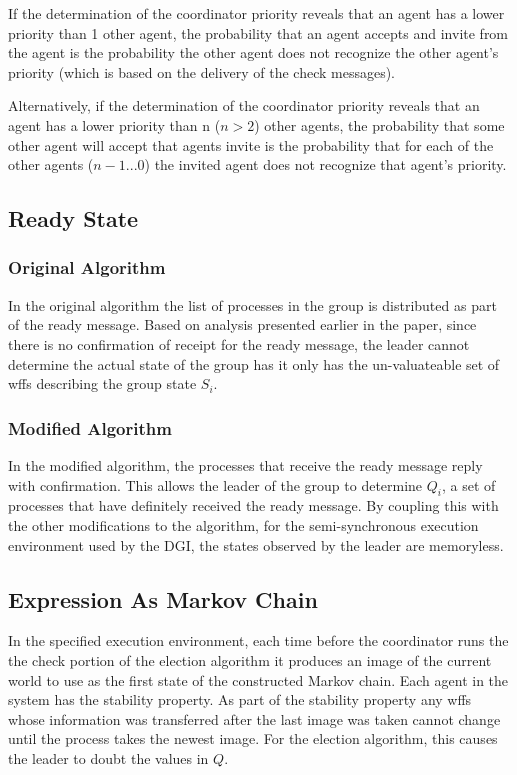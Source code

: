 If the determination of the coordinator priority reveals that an agent has a lower priority than 1 other agent, the probability that an agent accepts and invite from the agent is the probability the other agent does not recognize the other agent's priority (which is based on the delivery of the check messages).

Alternatively, if the determination of the coordinator priority reveals that an agent has a lower priority than n ($n > 2$) other agents, the probability that some other agent will accept that agents invite is the probability that for each of the other agents ($n-1 ... 0$) the invited agent does not recognize that agent's priority.

\subsection{Ready State}

\subsubsection{Original Algorithm}

In the original algorithm the list of processes in the group is distributed as part of the ready message. Based on analysis presented earlier in the paper, since there is no confirmation of receipt for the ready message, the leader cannot determine the actual state of the group has it only has the un-valuateable set of wffs describing the group state $S_i$.

\subsubsection{Modified Algorithm}

In the modified algorithm, the processes that receive the ready message reply with confirmation. This allows the leader of the group to determine $Q_i$, a set of processes that have definitely received the ready message. By coupling this with the other modifications to the algorithm, for the semi-synchronous execution environment used by the DGI, the states observed by the leader are memoryless.

\subsection{Expression As Markov Chain}

In the specified execution environment, each time before the coordinator runs the the check portion of the election algorithm it produces an image of the current world to use as the first state of the constructed Markov chain. Each agent in the system has the stability property. As part of the stability property any wffs whose information was transferred after the last image was taken cannot change until the process takes the newest image. For the election algorithm, this causes the leader to doubt the values in $Q$.

